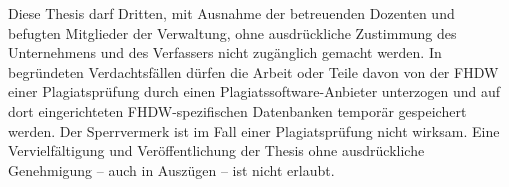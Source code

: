 

Diese Thesis darf Dritten, mit Ausnahme der betreuenden Dozenten und befugten Mitglieder der Verwaltung, ohne ausdrückliche Zustimmung des Unternehmens und des Verfassers nicht zugänglich gemacht werden.
In begründeten Verdachtsfällen dürfen die Arbeit oder Teile davon von der FHDW einer Plagiatsprüfung durch einen Plagiatssoftware-Anbieter unterzogen und auf dort eingerichteten FHDW-spezifischen Datenbanken temporär gespeichert werden.
Der Sperrvermerk ist im Fall einer Plagiatsprüfung nicht wirksam.
Eine Vervielfältigung und Veröffentlichung der Thesis ohne ausdrückliche Genehmigung – auch in Auszügen – ist nicht erlaubt.
